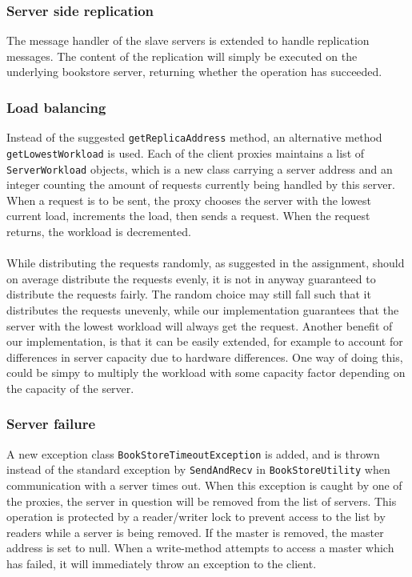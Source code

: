 \documentclass[12pt]{article}
\begin{document}
\subsubsection*{Server side replication}
The message handler of the slave servers is extended to handle replication messages. The content of the replication will simply be executed on the underlying bookstore server, returning whether the operation has succeeded.
\subsubsection*{Load balancing}
Instead of the suggested \verb|getReplicaAddress| method, an alternative method \verb|getLowestWorkload| is used. Each of the client proxies maintains a list of \verb|ServerWorkload| objects, which is a new class carrying a server address and an integer counting the amount of requests currently being handled by this server. When a request is to be sent, the proxy chooses the server with the lowest current load, increments the load, then sends a request. When the request returns, the workload is decremented.
\\
\\
While distributing the requests randomly, as suggested in the assignment, should on average distribute the requests evenly, it is not in anyway guaranteed to distribute the requests fairly. The random choice may still fall such that it distributes the requests unevenly, while our implementation guarantees that the server with the lowest workload will always get the request. Another benefit of our implementation, is that it can be easily extended, for example to account for differences in server capacity due to hardware differences. One way of doing this, could be simpy to multiply the workload with some capacity factor depending on the capacity of the server.
\subsubsection*{Server failure}
A new exception class \verb|BookStoreTimeoutException| is added, and is thrown instead of the standard exception by \verb|SendAndRecv| in \verb|BookStoreUtility| when communication with a server times out. When this exception is caught by one of the proxies, the server in question will be removed from the list of servers. This operation is protected by a reader/writer lock to prevent access to the list by readers while a server is being removed. If the master is removed, the master address is set to null. When a write-method attempts to access a master which has failed, it will immediately throw an exception to the client.
\end{document}
